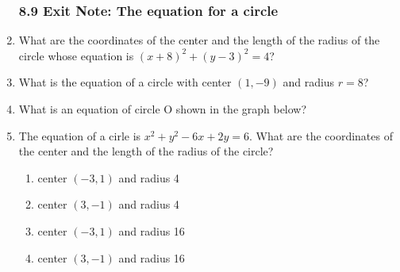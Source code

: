 \documentclass[12pt, twoside]{article}
\begin{document}
\begin{enumerate}
\newpage
\subsubsection*{8.9 Exit Note: The equation for a circle}
  \item What are the coordinates of the center and the length of the radius of the circle whose equation is $(x+8)^2+(y-3)^2=4$? \vspace{1.5cm}

  \item What is the equation of a circle with center $(1,-9)$ and radius $r=8$?\vspace{1.5cm}
  
\item What is an equation of circle O shown in the graph below?
  \begin{center}
  \end{center} \vspace{2cm}

\item %
The equation of a cirle is $x^2+y^2-6x+2y=6$. What are the coordinates of the center and the length of the radius of the circle?
  \begin{enumerate}
    \item center $(-3,1)$ and radius 4
    \item center $(3,-1)$ and radius 4
    \item center $(-3,1)$ and radius 16
    \item center $(3,-1)$ and radius 16
  \end{enumerate}

\end{enumerate}
\end{document}
